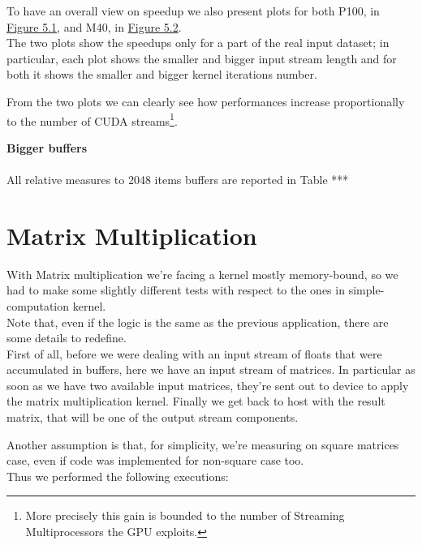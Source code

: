	To have an overall view on speedup we also present plots for both P100, in  \hyperref[fig:p100sp]{Figure 5.1}, and M40, in \hyperref[fig:m40sp]{Figure 5.2}.\\
	The two plots show the speedups only for a part of the real input dataset; in particular, each plot shows the smaller and bigger input stream length and for both it shows the smaller and bigger kernel iterations number.
	
	From the two plots we can clearly see how performances increase proportionally to the number of CUDA streams\footnote{More precisely this gain is bounded to the number of Streaming Multiprocessors the GPU exploits.}.
			
			
	{\large \textbf{Bigger buffers}}\\\\
			All relative measures to 2048 items buffers are reported in Table ***


\section{Matrix Multiplication}
With Matrix multiplication we're facing a kernel mostly memory-bound, so we had to make some slightly different tests with respect to the ones in simple-computation kernel.\\
Note that, even if the logic is the same as the previous application, there are some details to redefine.\\
First of all, before we were dealing with an input stream of floats that were accumulated in buffers, here we have an input stream of matrices. In particular as soon as we have two available input matrices, they're sent out to device to apply the matrix multiplication kernel. Finally we get back to host with the result matrix, that will be one of the output stream components.

Another assumption is that, for simplicity, we're measuring on square matrices case, even if code was implemented for non-square case too. \\
Thus we performed the following executions:

